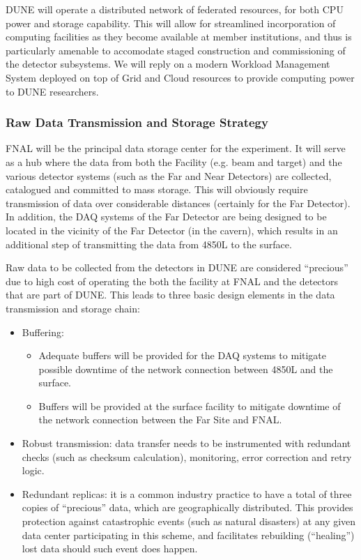DUNE will operate a  distributed network of federated resources, for both CPU power and storage capability. This will allow for streamlined incorporation
of computing facilities as they become available at member institutions, and thus is particularly amenable to accomodate staged construction and commissioning
of the detector subsystems. We will reply on a modern Workload Management System deployed on top of Grid and Cloud resources to provide computing
power to DUNE researchers.

\subsubsection{Raw Data Transmission and Storage Strategy}
FNAL will be the principal data storage center for the experiment. It will serve as a hub where the data from both the Facility (e.g. beam and target)
and the various detector systems (such as the  Far and Near Detectors)  are collected, catalogued and committed to mass storage. This will obviously require transmission of
data over considerable distances (certainly for the Far Detector). In addition, the DAQ systems of the Far Detector are being designed to be located  in the vicinity of
the Far Detector (in the cavern), which results in an additional step of transmitting the data from 4850L to the surface.

Raw data to be collected from the detectors in DUNE are considered ``precious'' due to high cost of operating the both the facility at FNAL
and the detectors that are part of DUNE. This leads to three basic design elements in the data transmission and storage chain:
\begin{itemize}
\item Buffering:
\begin{itemize}
\item Adequate buffers will be provided for the DAQ systems  to mitigate possible downtime of the network connection between 4850L and the surface.
\item Buffers will be provided at the surface facility to mitigate downtime of the network connection between the Far Site and FNAL.
\end{itemize}
\item Robust transmission: data transfer needs to be instrumented with redundant checks (such as checksum calculation), monitoring, error correction and retry logic.
\item Redundant replicas: it is a common industry practice to have a total of three copies of ``precious'' data, which are geographically distributed. This provides protection against catastrophic events (such as natural disasters) at any given data center participating in this scheme, and facilitates rebuilding (``healing'')  lost data should such event does happen.
\end{itemize}



